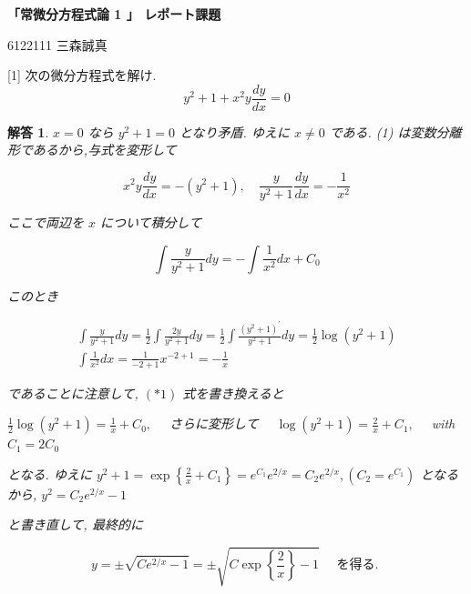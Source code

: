\documentclass[10pt]{jsarticle}
\newtheorem*{answer*}{解答}
\begin{document}
\textbf{「常微分方程式論 1 」 レポート課題}

\begin{flushright}
6122111 三森誠真
\end{flushright}


\begin{itembox}[l]{[1] 次の微分方程式を解け.}
\begin{equation*}
y^{2}+1+x^{2} y \frac{d y}{d x}=0 \tag{1}
\end{equation*}
  
\end{itembox}



\bigskip

\begin{answer*}
$x=0$ なら $y^{2}+1=0$ となり矛盾. ゆえに $x \neq 0$ である. (1) は変数分離形であるから,与式を変形して

$$
x^{2} y \frac{d y}{d x}=-\left(y^{2}+1\right), \quad \frac{y}{y^{2}+1} \frac{d y}{d x}=-\frac{1}{x^{2}}
$$

ここで両辺を $x$ について積分して


\begin{equation*}
\int \frac{y}{y^{2}+1} d y=-\int \frac{1}{x^{2}} d x+C_{0} \tag{*1}
\end{equation*}


このとき

$$
\begin{gathered}
\int \frac{y}{y^{2}+1} d y=\frac{1}{2} \int \frac{2 y}{y^{2}+1} d y=\frac{1}{2} \int \frac{\left(y^{2}+1\right)^{\prime}}{y^{2}+1} d y=\frac{1}{2} \log \left(y^{2}+1\right) \\
\int \frac{1}{x^{2}} d x=\frac{1}{-2+1} x^{-2+1}=-\frac{1}{x}
\end{gathered}
$$

であることに注意して, $(* 1)$ 式を書き換えると

$\frac{1}{2} \log \left(y^{2}+1\right)=\frac{1}{x}+C_{0}, \quad$ さらに変形して $\quad \log \left(y^{2}+1\right)=\frac{2}{x}+C_{1}, \quad$ with $C_{1}=2 C_{0}$

となる. ゆえに $y^{2}+1=\exp \left\{\frac{2}{x}+C_{1}\right\}=e^{C_{1}} e^{2 / x}=C_{2} e^{2 / x},\left(C_{2}=e^{C_{1}}\right)$ となるから, $y^{2}=C_{2} e^{2 / x}-1$ 

と書き直して, 最終的に

$$
y= \pm \sqrt{C e^{2 / x}-1}= \pm \sqrt{C \exp \left\{\frac{2}{x}\right\}-1} \quad \text { を得る. }
$$

\end{answer*}
\end{document}
